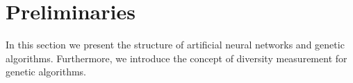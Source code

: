 \section{Preliminaries}
\label{sec:preliminaries}

In this section we present the structure of artificial neural networks and genetic algorithms. Furthermore, we introduce the concept of diversity measurement for genetic algorithms.






